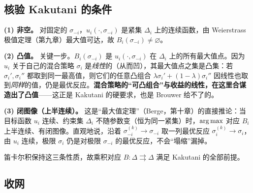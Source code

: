 \subsection{核验 Kakutani 的条件}
\label{sec:fixedpt-nash-verify}

\textbf{(1) 非空。} 对固定的 $\sigma_{-i}$，$u_i(\cdot,\sigma_{-i})$ 是紧集 $\Delta_i$ 上的连续函数，由 Weierstrass 极值定理（第九章）最大值可达，故 $B_i(\sigma_{-i})\neq\varnothing$。

\textbf{(2) 凸值。} 关键一步。$B_i(\sigma_{-i})$ 是 $u_i(\cdot,\sigma_{-i})$ 在 $\Delta_i$ 上的所有最大值点。因为 $u_i$ 关于自己的混合策略 $\sigma_i$ 是\emph{线性}的（从而凹），其最大值点之集是凸集：若 $\sigma_i',\sigma_i''$ 都取到同一最高值，则它们的任意凸组合 $\lambda\sigma_i'+(1-\lambda)\sigma_i''$ 因线性也取到\emph{同样}的值，仍是最优反应。\textbf{混合策略的``可凸组合''与收益的线性，在这里合谋造出了凸值}——这正是 Kakutani 的硬要求，也是 Brouwer 给不了的。

\textbf{(3) 闭图像（上半连续）。} 这是``最大值定理''（Berge，第十章）的直接推论：当目标函数 $u_i$ 连续、约束集 $\Delta_i$ 不随参数变（恒为同一紧集）时，$\operatorname*{arg\,max}$ 对应 $B_i$ 上半连续、有闭图像。直观地说，沿着 $\sigma_{-i}^{(k)}\to\sigma_{-i}$ 取一列最优反应 $\sigma_i^{(k)}\to\sigma_i$，由 $u_i$ 连续，极限 $\sigma_i$ 仍是对极限 $\sigma_{-i}$ 的最优反应，不会``塌缩''漏掉。

笛卡尔积保持这三条性质，故乘积对应 $B:\Delta\rightrightarrows\Delta$ 满足 Kakutani 的全部前提。

\subsection{收网}
\label{sec:fixedpt-nash-close}



